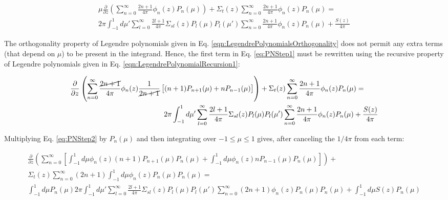 \documentclass[10pt]{article}
\begin{document}
\begin{flushleft}
\begin{equation}
\label{eq:PNStep1}
\begin{aligned}
\mu \frac{\partial}{\partial z}\left(\sum_{n=0}^{\infty}\frac{2n+1}{4\pi}\phi_n(z)P_n(\mu)\right) + \Sigma_t(z)\sum_{n=0}^{\infty}\frac{2n+1}{4\pi}\phi_n(z)P_n(\mu) =\quad\quad\\
2\pi\int_{-1}^{1} d\mu' \sum_{l=0}^{\infty}\frac{2l+1}{4\pi}\Sigma_{sl}(z)P_l(\mu)P_l(\mu')\sum_{n=0}^{\infty}\frac{2n+1}{4\pi}\phi_n(z)P_n(\mu) + \frac{S(z)}{4\pi}
 \end{aligned}
 \end{equation}
 
The orthogonality property of Legendre polynomials given in Eq. \eqref{eqn:LegendrePolynomialsOrthogonality} does not permit any extra terms (that depend on \(\mu\)) to be present in the integrand. Hence, the first term in Eq. \eqref{eq:PNStep1} must be rewritten using the recursive property of Legendre polynomials given in Eq. \eqref{eqn:LegendrePolynomialRecursion1}:

 \begin{equation}
\label{eq:PNStep2}
\begin{aligned}
\frac{\partial}{\partial z}\left(\sum_{n=0}^{\infty}\frac{\cancel{2n+1}}{4\pi}\phi_n(z)\frac{1}{\cancel{2n+1}} \left\lbrack(n+1)P_{n+1}(\mu) + n P_{n-1}(\mu)\right\rbrack\right) + \Sigma_t(z)\sum_{n=0}^{\infty}\frac{2n+1}{4\pi}\phi_n(z)P_n(\mu) =\quad\quad\\
2\pi\int_{-1}^{1} d\mu' \sum_{l=0}^{\infty}\frac{2l+1}{4\pi}\Sigma_{sl}(z)P_l(\mu)P_l(\mu')\sum_{n=0}^{\infty}\frac{2n+1}{4\pi}\phi_n(z)P_n(\mu) + \frac{S(z)}{4\pi}
 \end{aligned}
 \end{equation}
 
 Multiplying Eq. \eqref{eq:PNStep2} by \(P_n(\mu)\) and then integrating over \(-1\leq\mu\leq1\) gives, after canceling the \(1/4\pi\) from each term:
 
  \begin{equation}
\label{eq:PNStep3}
\begin{aligned}
\frac{\partial}{\partial z}\left(\sum_{n=0}^{\infty}\left\lbrack\int_{-1}^{1}d\mu\phi_n(z)(n+1)P_{n+1}(\mu)P_n(\mu) + \int_{-1}^{1}d\mu\phi_n(z)n P_{n-1}(\mu)P_n(\mu)\right\rbrack\right) + \quad\quad\\
\Sigma_t(z)\sum_{n=0}^{\infty}(2n+1)\int_{-1}^{1}d\mu\phi_n(z)P_n(\mu)P_n(\mu) =\quad\quad\\
\int_{-1}^{1}d\mu P_n(\mu)2\pi\int_{-1}^{1} d\mu' \sum_{l=0}^{\infty}\frac{2l+1}{4\pi}\Sigma_{sl}(z)P_l(\mu)P_l(\mu')\sum_{n=0}^{\infty}(2n+1)\phi_n(z)P_n(\mu)P_n(\mu) + \int_{-1}^{1}d\mu S(z)P_n(\mu)
 \end{aligned}
 \end{equation}


\end{flushleft}
\end{document}
